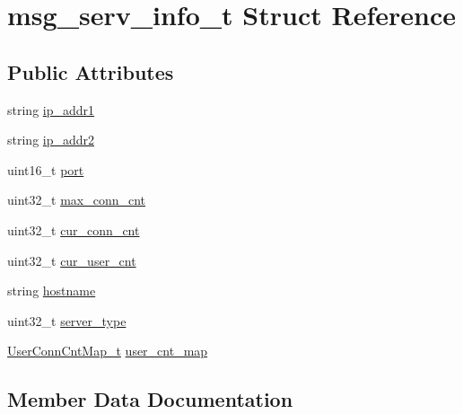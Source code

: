 \hypertarget{structmsg__serv__info__t}{}\section{msg\+\_\+serv\+\_\+info\+\_\+t Struct Reference}
\label{structmsg__serv__info__t}
\subsection*{Public Attributes}
\begin{DoxyCompactItemize}
\item 
string \hyperlink{structmsg__serv__info__t_a1ad1dbd434ed8d62aa1e5d6980f56e54}{ip\+\_\+addr1}
\item 
string \hyperlink{structmsg__serv__info__t_a9b2d83f817b70371c35231d85c826c38}{ip\+\_\+addr2}
\item 
uint16\+\_\+t \hyperlink{structmsg__serv__info__t_aec8d7099ad41227d5407b2893dfaa96d}{port}
\item 
uint32\+\_\+t \hyperlink{structmsg__serv__info__t_adbed9967db16aadb67f710feda1ba51a}{max\+\_\+conn\+\_\+cnt}
\item 
uint32\+\_\+t \hyperlink{structmsg__serv__info__t_af4f3ecd856c600e4d904df435ae46294}{cur\+\_\+conn\+\_\+cnt}
\item 
uint32\+\_\+t \hyperlink{structmsg__serv__info__t_a0ba7581b6d0b3a7cf78949ed9cb99e20}{cur\+\_\+user\+\_\+cnt}
\item 
string \hyperlink{structmsg__serv__info__t_a0115a8cff6432cd34152555571e0352b}{hostname}
\item 
uint32\+\_\+t \hyperlink{structmsg__serv__info__t_aba9d9c51de73ca23dec4bd78b3134762}{server\+\_\+type}
\item 
\hyperlink{imconn_8h_ad782c407f75cb59ef9d916f265a7aaec}{User\+Conn\+Cnt\+Map\+\_\+t} \hyperlink{structmsg__serv__info__t_ae0cadf76671bcbe776fd5c530717530d}{user\+\_\+cnt\+\_\+map}
\end{DoxyCompactItemize}


\subsection{Member Data Documentation}
\hypertarget{structmsg__serv__info__t_af4f3ecd856c600e4d904df435ae46294}{}
